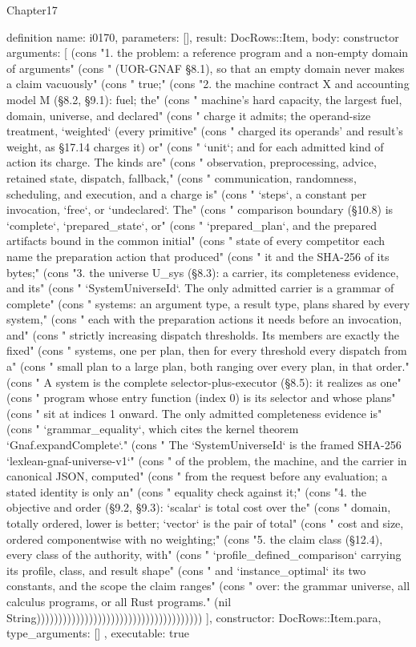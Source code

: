 \begin{lexlean}{Chapter17}
\begin{semanticmodule}
definition{
  name: i0170,
  parameters: [],
  result: DocRows::Item,
  body: constructor{
    arguments: [
      (cons "1. the problem: a reference program and a non-empty domain of arguments" (cons "   (UOR-GNAF §8.1), so that an empty domain never makes a claim vacuously" (cons "   true;" (cons "2. the machine contract X and accounting model M (§8.2, §9.1): fuel; the" (cons "   machine's hard capacity, the largest fuel, domain, universe, and declared" (cons "   charge it admits; the operand-size treatment, `weighted` (every primitive" (cons "   charged its operands' and result's weight, as §17.14 charges it) or" (cons "   `unit`; and for each admitted kind of action its charge. The kinds are" (cons "   observation, preprocessing, advice, retained state, dispatch, fallback," (cons "   communication, randomness, scheduling, and execution, and a charge is" (cons "   `steps`, a constant per invocation, `free`, or `undeclared`. The" (cons "   comparison boundary (§10.8) is `complete`, `prepared_state`, or" (cons "   `prepared_plan`, and the prepared artifacts bound in the common initial" (cons "   state of every competitor each name the preparation action that produced" (cons "   it and the SHA-256 of its bytes;" (cons "3. the universe U_sys (§8.3): a carrier, its completeness evidence, and its" (cons "   `SystemUniverseId`. The only admitted carrier is a grammar of complete" (cons "   systems: an argument type, a result type, plans shared by every system," (cons "   each with the preparation actions it needs before an invocation, and" (cons "   strictly increasing dispatch thresholds. Its members are exactly the fixed" (cons "   systems, one per plan, then for every threshold every dispatch from a" (cons "   small plan to a large plan, both ranging over every plan, in that order." (cons "   A system is the complete selector-plus-executor (§8.5): it realizes as one" (cons "   program whose entry function (index 0) is its selector and whose plans" (cons "   sit at indices 1 onward. The only admitted completeness evidence is" (cons "   `grammar_equality`, which cites the kernel theorem `Gnaf.expandComplete`." (cons "   The `SystemUniverseId` is the framed SHA-256 `lexlean-gnaf-universe-v1`" (cons "   of the problem, the machine, and the carrier in canonical JSON, computed" (cons "   from the request before any evaluation; a stated identity is only an" (cons "   equality check against it;" (cons "4. the objective and order (§9.2, §9.3): `scalar` is total cost over the" (cons "   domain, totally ordered, lower is better; `vector` is the pair of total" (cons "   cost and size, ordered componentwise with no weighting;" (cons "5. the claim class (§12.4), every class of the authority, with" (cons "   `profile_defined_comparison` carrying its profile, class, and result shape" (cons "   and `instance_optimal` its two constants, and the scope the claim ranges" (cons "   over: the grammar universe, all calculus programs, or all Rust programs." (nil String))))))))))))))))))))))))))))))))))))))
    ],
    constructor: DocRows::Item.para,
    type_arguments: []
  },
  executable: true
}


\end{semanticmodule}
\end{lexlean}
